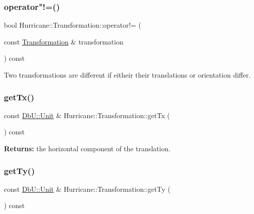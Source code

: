 \subsubsection{\texorpdfstring{operator"!=()}{operator!=()}}
{\footnotesize\ttfamily bool Hurricane\+::\+Transformation\+::operator!= (\begin{DoxyParamCaption}\item[{const \hyperlink{classHurricane_1_1Transformation}{Transformation} \&}]{transformation }\end{DoxyParamCaption}) const}

Two transformations are different if eitheir their translations or orientation differ. \mbox{\label{classHurricane_1_1Transformation_a08e8c1f23a73fcd1eb111c65695e848a}} 
\subsubsection{\texorpdfstring{get\+Tx()}{getTx()}}
{\footnotesize\ttfamily const \hyperlink{group__DbUGroup_ga4fbfa3e8c89347af76c9628ea06c4146}{Db\+U\+::\+Unit} \& Hurricane\+::\+Transformation\+::get\+Tx (\begin{DoxyParamCaption}{ }\end{DoxyParamCaption}) const\hspace{0.3cm}{\ttfamily [inline]}}

{\bfseries Returns\+:} the horizontal component of the translation. \mbox{\label{classHurricane_1_1Transformation_a0915bbf45c26ae91662653ce394ee203}} 
\subsubsection{\texorpdfstring{get\+Ty()}{getTy()}}
{\footnotesize\ttfamily const \hyperlink{group__DbUGroup_ga4fbfa3e8c89347af76c9628ea06c4146}{Db\+U\+::\+Unit} \& Hurricane\+::\+Transformation\+::get\+Ty (\begin{DoxyParamCaption}{ }\end{DoxyParamCaption}) const\hspace{0.3cm}{\ttfamily [inline]}}

